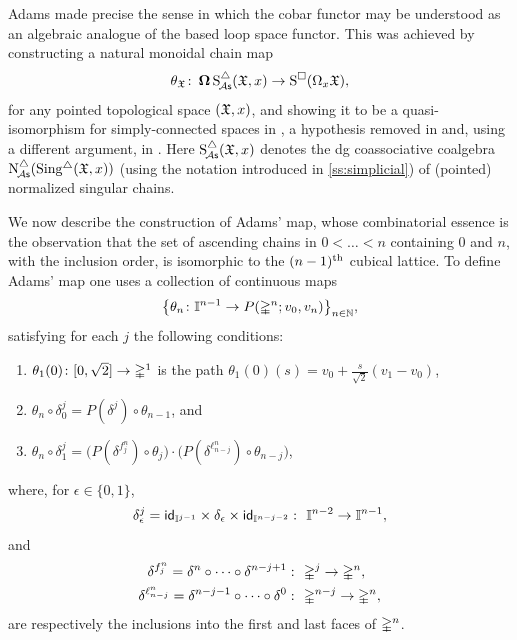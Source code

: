 Adams made precise the sense in which the cobar functor may be understood as an algebraic analogue of the based loop space functor.
This was achieved by constructing a natural monoidal chain map
\begin{equation}\label{e:adams map 2}
	\theta_{\fX} \colon \cobar \sSchainsA(\fX,x) \to \cSchains(\loops_x \fX),
\end{equation}
for any pointed topological space $(\fX,x)$, and showing it to be a quasi-isomorphism for simply-connected spaces in \cite{adams1956cobar}, a hypothesis removed in \cite{rivera2018cubical} and, using a different argument, in \cite{rivera2019path}. Here $\sSchainsA(\fX,x)$ denotes the dg coassociative coalgebra $\schainsA(\sSing(\fX,x))$ (using the notation introduced in \ref{ss:simplicial}) of (pointed) normalized singular chains. 

We now describe the construction of Adams' map, whose combinatorial essence is the observation that the set of ascending chains in $0 < \dots < n$ containing $0$ and $n$, with the inclusion order, is isomorphic to the $(n-1)^\th$ cubical lattice.
To define Adams' map one uses a collection of continuous maps
\[
\set[\big]{\theta_n \colon \gcube^{n-1} \to P(\gsimplex^n;v_0,v_n)}_{n\in\N},
\]
satisfying for each $j$ the following conditions:
\begin{enumerate}
	\item $\theta_1(0)\colon [0,\sqrt{2}] \to \gsimplex^1$ is the path $\theta_1(0)(s) = v_0 + \frac{s}{\sqrt{2}}(v_1-v_0)$,
	\item $\theta_n \circ \delta_0^j = P(\delta^j) \circ \theta_{n-1}$, and
	\item $\theta_n \circ \delta_1^j =
	\big(P(\delta^{f^n_j}) \circ \theta_j\big) \cdot \big(P(\delta^{\ell^n_{n-j}}) \circ \theta_{n-j}\big)$,
\end{enumerate}
where, for $\epsilon \in \{0,1\}$,
\[
\delta_\epsilon^j = \id_{\gcube^{j-1}} \times \delta_\epsilon \times \id_{\gcube^{n-j-2}} \,\colon\ \gcube^{n-2} \to \gcube^{n-1},
\]
and
\[
\begin{split}
	\delta^{f^n_j} = \delta^n \circ \dotsb \circ \delta^{n-j+1} &\,\colon\ \gsimplex^j \to \gsimplex^n, \\
	\delta^{\ell^n_{n-j}} = \delta^{n-j-1} \circ \dotsb \circ \delta^{0} &\, \colon\ \gsimplex^{n-j} \to \gsimplex^n,
\end{split}
\]
are respectively the inclusions into the first and last faces of $\gsimplex^n$.

